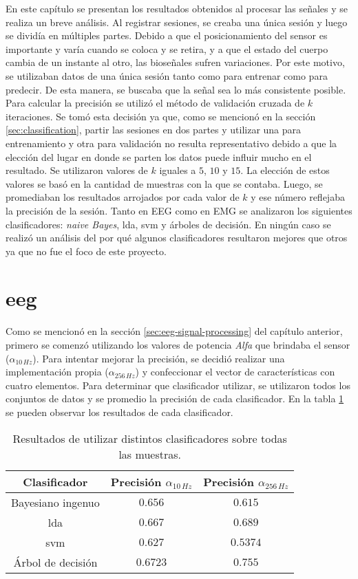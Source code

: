 En este capítulo se presentan los resultados obtenidos al procesar las señales y se realiza un breve análisis. Al registrar sesiones,  se creaba una única sesión y luego se dividía en múltiples partes. Debido a que el posicionamiento del sensor es importante y varía cuando se coloca y se retira,  y a que el estado del cuerpo cambia de un instante al otro, las bioseñales sufren variaciones. Por este motivo, se utilizaban datos de una única sesión tanto como para entrenar como para predecir. De esta manera, se buscaba que la señal sea lo más consistente posible. Para calcular la precisión se utilizó el método de validación cruzada de $k$ iteraciones. Se tomó esta decisión ya que, como se mencionó en la sección \ref{sec:classification}, partir las sesiones en dos partes y utilizar una para entrenamiento y otra para validación no resulta representativo debido a que la elección del lugar en donde se parten los datos puede influir mucho en el resultado. Se utilizaron valores de $k$ iguales a $5$, $10$ y $15$. La elección de estos valores se basó en la cantidad de muestras con la que se contaba. Luego, se promediaban los resultados arrojados por cada valor de $k$ y ese número reflejaba la precisión de la sesión. Tanto en EEG como en EMG se analizaron los siguientes clasificadores: \emph{naive Bayes},  \acrshort{lda}, \gls{svm} y árboles de decisión. En ningún caso se realizó un análisis del por qué algunos clasificadores resultaron mejores que otros ya que no fue el foco de este proyecto.

\section{\acrshort{eeg}}

Como se mencionó en la sección \ref{sec:eeg-signal-processing} del capítulo anterior, primero se comenzó utilizando los valores de potencia \emph{Alfa} que brindaba el sensor ($\alpha_{10 \, Hz}$). Para intentar mejorar la precisión, se decidió realizar una implementación propia ($\alpha_{256 \, Hz}$) y confeccionar el vector de características con cuatro elementos. Para determinar que clasificador utilizar, se utilizaron todos los conjuntos de datos y se promedio la precisión de cada clasificador. En la tabla \ref{tab:eeg-class-result} se pueden observar los resultados de cada clasificador.
 
\begin{table}[H]
\centering
\begin{tabular}{ |c|c|c| } 
 \hline
 Clasificador & Precisión $\alpha_{10 \, Hz}$ &  Precisión $\alpha_{256 \, Hz}$ \\ 
 \hline
 Bayesiano ingenuo & $0.656$  & $0.615$  \\
 \hline
 \gls{lda}  & $0.667$ & $0.689$ \\
  \hline
  \gls{svm} & $0.627$ & $0.5374$ \\
  \hline
 Árbol de decisión & $0.6723$ & $0.755$ \\
 \hline
\end{tabular}
\caption{Resultados de utilizar distintos clasificadores sobre todas las muestras.}
\label{tab:eeg-class-result}
\end{table}


